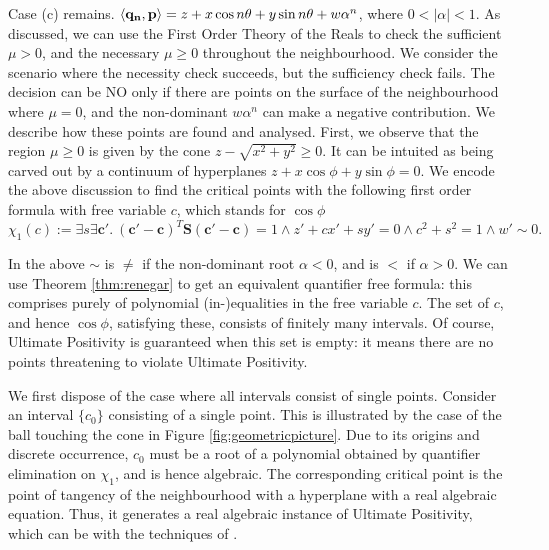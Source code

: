 
Case (c) remains. $\langle\mathbf{q_n}, \mathbf{p}\rangle = z + x\cos n\theta + y\sin n\theta + w\alpha^n$, where $0 < |\alpha| < 1$. As discussed, we can use the First Order Theory of the Reals to check the sufficient $\mu > 0$, and the necessary $\mu \ge 0$ throughout the neighbourhood. We consider the scenario where the necessity check succeeds, but the sufficiency check fails. The decision can be NO only if there are points on the surface of the neighbourhood where $\mu = 0$, and the non-dominant $w\alpha^n$ can make a negative contribution. We describe how these points are found and analysed. First, we observe that the region $\mu \ge 0$ is given by the cone $z - \sqrt{x^2 + y^2} \ge 0$. It can be intuited as being carved out by a continuum of hyperplanes $z + x\cos\phi + y\sin\phi = 0$. We encode the above discussion to find the critical points with the following first order formula with free variable $c$, which stands for $\cos \phi$
\begin{equation}
\label{eq:intersection}
\chi_1(c):= \exists s \exists \mathbf{c'}.~ (\mathbf{c'} - \mathbf{c})^T\mathbf{S}(\mathbf{c'} - \mathbf{c}) = 1 \land z' + cx' + sy' = 0 \land c^2 + s^2 = 1 \land w' \sim 0.
\end{equation}

In the above $\sim$ is $\ne$ if the non-dominant root $\alpha < 0$, and is $<$ if $\alpha > 0$. We can use Theorem \ref{thm:renegar} to get an equivalent quantifier free formula: this comprises purely of polynomial (in-)equalities in the free variable $c$. The set of $c$, and hence $\cos \phi$, satisfying these, consists of finitely many intervals. Of course, Ultimate Positivity is guaranteed when this set is empty: it means there are no points threatening to violate Ultimate Positivity.

We first dispose of the case where all intervals consist of single points. Consider an interval $\{c_0\}$ consisting of a single point. This is illustrated by the case of the ball touching the cone in Figure \ref{fig:geometricpicture}. Due to its origins and discrete occurrence, $c_0$ must be a root of a polynomial obtained by quantifier elimination on $\chi_1$, and is hence algebraic. The corresponding critical point is the point of tangency of the neighbourhood with a hyperplane with a real algebraic equation. Thus, it generates a real algebraic instance of Ultimate Positivity, which can be with the techniques of \cite{ouaknine2014ultimate}.

